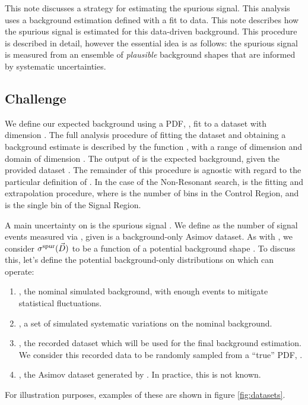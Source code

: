 \label{sec:backgroundEnsamble}


This note discusses a strategy for estimating the spurious signal. This analysis uses a background estimation defined with a fit to data. This note describes how the spurious signal is estimated for this data-driven background.
This procedure is described in detail, however the essential idea is as follows: the spurious signal is measured from an ensemble of \emph{plausible} background shapes that are informed by systematic uncertainties.

\subsection*{Challenge}

We define our expected background using a PDF, \func, fit to a dataset \template with dimension \ddata. The full analysis procedure of fitting the dataset and obtaining a background estimate is described by the function \eeNbkg, with a range of dimension \dbkg and domain of dimension \ddata. The output of \eeNbkg is the expected background, given the provided dataset \template. The remainder of this procedure is agnostic with regard to the particular definition of \eeNbkg. In the case of the Non-Resonant search, \eeNbkg is the fitting and extrapolation procedure, where \ddata is the number of bins in the Control Region, and \dbkg is the single bin of the Signal Region.

A main uncertainty on \eeNbkg is the spurious signal \spur.
We define \spur as the number of signal events measured via \eeNbkg, given \template is a background-only Asimov dataset.
As with \eeNbkg, we consider $\sigma^\mathrm{spur}(\vec{D})$ to be a function of a potential background shape \template.
To discuss this, let's define the potential background-only distributions on which \eeNbkg can operate:
\begin{enumerate}
    \item \mc, the nominal simulated background, with enough events to mitigate statistical fluctuations.
    \item \syst, a set of simulated systematic variations on the nominal background.
    \item \data, the recorded dataset which will be used for the final background estimation. We consider this recorded data to be randomly sampled from a ``true'' PDF, \truth.
    \item \truthdata, the Asimov dataset generated by \truth. In practice, this is not known.
\end{enumerate}
For illustration purposes, examples of these are shown in figure \ref{fig:datasets}.

